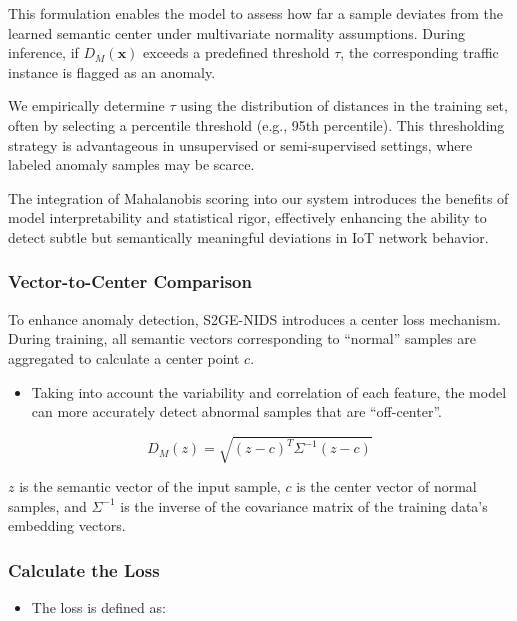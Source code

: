 \begin{ZhChapter}
This formulation enables the model to assess how far a sample deviates from the learned semantic center under multivariate normality assumptions. During inference, if $D_M(\mathbf{x})$ exceeds a predefined threshold $\tau$, the corresponding traffic instance is flagged as an anomaly.

We empirically determine $\tau$ using the distribution of distances in the training set, often by selecting a percentile threshold (e.g., 95th percentile). This thresholding strategy is advantageous in unsupervised or semi-supervised settings, where labeled anomaly samples may be scarce.

The integration of Mahalanobis scoring into our system introduces the benefits of model interpretability and statistical rigor, effectively enhancing the ability to detect subtle but semantically meaningful deviations in IoT network behavior.


\subsubsection{Vector-to-Center Comparison}
To enhance anomaly detection, S2GE-NIDS introduces a center loss mechanism. During training, all semantic vectors corresponding to ``normal'' samples are aggregated to calculate a center point $c$.

\begin{itemize}
\item Taking into account the variability and correlation of each feature, the model can more accurately detect abnormal samples that are ``off-center''.
\end{itemize}

\begin{equation}
D_M(z) = \sqrt{(z - c)^T \Sigma^{-1} (z - c)}
\label{eq:mahalanobis}
\end{equation}

$z$ is the semantic vector of the input sample, $c$ is the center vector of normal samples, and $\Sigma^{-1}$ is the inverse of the covariance matrix of the training data's embedding vectors.


\subsubsection{Calculate the Loss}
\begin{itemize}
    \item The loss is defined as:
\end{itemize}


\end{ZhChapter}
